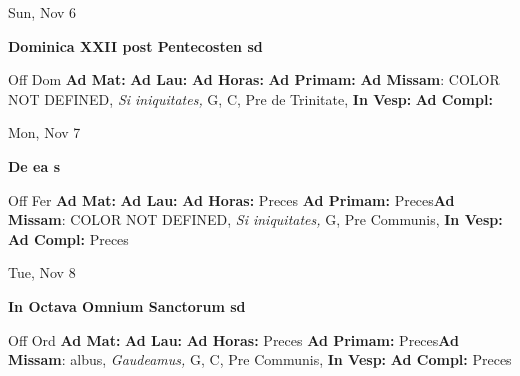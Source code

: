 \documentclass[10pt]{memoir}
\begin{document}
\begin{center}
\begin{minipage}{3.5in}
\vspace{2em}
\begin{center}Sun, Nov 6
\end{center}
\textbf{ \large Dominica XXII post Pentecosten
\textnormal{\normalsize sd}}

\begin{justify}Off Dom
\textbf{Ad Mat: }
\textbf{Ad Lau: }
\textbf{Ad Horas: }
\textbf{Ad Primam: }\textbf{Ad Missam}: COLOR NOT DEFINED, \textit{Si iniquitates,} G, C, Pre de Trinitate, 
\textbf{In Vesp: }
\textbf{Ad Compl: }
\end{justify}
\end{minipage}
\end{center}

\begin{center}
\begin{minipage}{3.5in}
\vspace{2em}
\begin{center}Mon, Nov 7
\end{center}
\textbf{ \large De ea
\textnormal{\normalsize s}}

\begin{justify}Off Fer
\textbf{Ad Mat: }
\textbf{Ad Lau: }
\textbf{Ad Horas: }Preces
\textbf{Ad Primam: }Preces\textbf{Ad Missam}: COLOR NOT DEFINED, \textit{Si iniquitates,} G, Pre Communis, 
\textbf{In Vesp: }
\textbf{Ad Compl: }Preces
\end{justify}
\end{minipage}
\end{center}

\begin{center}
\begin{minipage}{3.5in}
\vspace{2em}
\begin{center}Tue, Nov 8
\end{center}
\textbf{ \large In Octava Omnium Sanctorum
\textnormal{\normalsize sd}}

\begin{justify}Off Ord
\textbf{Ad Mat: }
\textbf{Ad Lau: }
\textbf{Ad Horas: }Preces
\textbf{Ad Primam: }Preces\textbf{Ad Missam}: albus, \textit{Gaudeamus,} G, C, Pre Communis, 
\textbf{In Vesp: }
\textbf{Ad Compl: }Preces
\end{justify}
\end{minipage}
\end{center}
\end{document}
